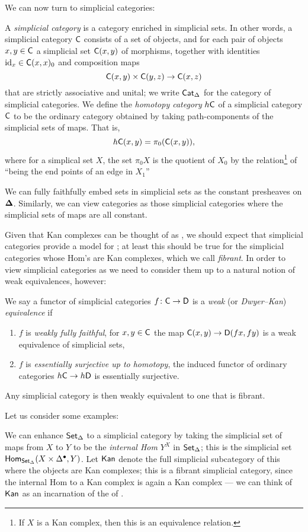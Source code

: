 \documentclass[a4paper,11pt]{article}
\begin{document}
We can now turn to simplicial categories:
\begin{defn}
  A \emph{simplicial category} is a category enriched in simplicial
  sets. In other words, a simplicial category $\textup{\textsf{C}}$ consists of a set
  of objects, and for each pair of objects $x,y \in \textup{\textsf{C}}$ a simplicial
  set $\textup{\textsf{C}}(x,y)$ of morphisms, together with identities $\text{\textup{id}}_{x} \in
  \textup{\textsf{C}}(x,x)_{0}$ and composition maps
  \[ \uC(x,y) \times \uC(y,z)\to \uC(x,z)\] that are strictly
  associative and unital; we write $\textup{\textsf{Cat}}_{\Delta}$ for the category of
  simplicial categories. We define the \emph{homotopy category}
  $h\textup{\textsf{C}}$ of a simplicial category $\textup{\textsf{C}}$ to be the ordinary category
  obtained by taking path-components of the simplicial sets of
  maps. That is,
  \[ h\textup{\textsf{C}}(x,y) = \pi_{0}(\textup{\textsf{C}}(x,y)),\] where for a simplical set $X$,
  the set $\pi_{0}X$ is the quotient of $X_{0}$ by the
  relation\footnote{If $X$ is a Kan complex, then this is an
    equivalence relation.} of ``being the end points of an edge in
  $X_{1}$''
\end{defn}

\begin{remark}
  We can fully faithfully embed sets in simplicial sets as the constant
  presheaves on $\boldsymbol{\Delta}$. Similarly, we can view categories as those
  simplicial categories where the simplicial sets of maps are all
  constant.
\end{remark}

Given that Kan complexes can be thought of as \igpds{}, we should
expect that simplicial categories provide a model for \icats{}; at
least this should be true for the simplicial categories whose Hom's
are Kan complexes, which we call \emph{fibrant}. In order to view
simplicial categories as \icats{} we need to
consider them up to a natural notion of weak
equivalences, however:
\begin{defn}\label{defn:DKeq}
  We say a functor of simplicial categories $f \colon \uC \to \uD$ is
  a \emph{weak} (or \emph{Dwyer--Kan}) \emph{equivalence} if
  \begin{enumerate}[(1)]
  \item $f$ is \emph{weakly fully faithful}, \ie{} for $x,y \in \textup{\textsf{C}}$
    the map $\uC(x,y) \to \uD(fx,fy)$ is a
    weak equivalence of simplicial sets,
  \item $f$ is \emph{essentially surjective up to homotopy}, \ie{} the
    induced functor of ordinary categories $h\uC \to h\uD$ is
    essentially surjective.
  \end{enumerate}
Any simplicial category is then weakly equivalent to one that is
fibrant.
\end{defn}
Let us consider some examples:
\begin{ex}
  We can enhance $\textup{\textsf{Set}}_{\Delta}$ to a simplicial category by taking the
  simplicial set of maps from $X$ to $Y$ to be the \emph{internal Hom}
  $Y^{X}$ in $\textup{\textsf{Set}}_{\Delta}$; this is the simplicial set $\textup{\textsf{Hom}}_{\textup{\textsf{Set}}_{\Delta}}(X
  \times \Delta^{\bullet}, Y)$. Let $\textup{\textsf{Kan}}$ denote the full
  simplicial subcategory of this where the objects are Kan complexes;
  this is a fibrant simplicial category, since the internal Hom to a
  Kan complex is again a Kan complex --- we can think of
  $\textup{\textsf{Kan}}$ as an incarnation of the \icat{} of \igpds{}.
\end{ex}
\end{document}
